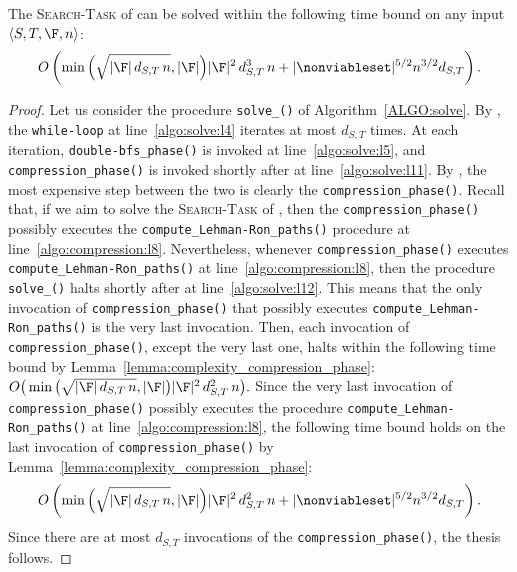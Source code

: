 \begin{proposition}\label{prop:complexity_solve_search}
The \textsc{Search-Task} of {\mainproblem} can be solved within the following time bound
on any input $\langle S, T, \F, n \rangle$:
\[
O\left(\min\Big(\sqrt{|\F|\, d_{S,T}\, n}, |\F|\Big) |\F|^2\, d^3_{S,T}\, n +
 |\nonviableset|^{5/2} n^{3/2} d_{S,T} \right).
\]
\end{proposition}
\begin{proof}
Let us consider the procedure \texttt{solve\_\mainproblem()} of Algorithm~\ref{ALGO:solve}.
By , the \texttt{while-loop} at line~\ref{algo:solve:l4} iterates at most $d_{S,T}$ times.
At each iteration, \texttt{double-bfs\_phase()} is invoked at line~\ref{algo:solve:l5},
and \texttt{compression\_phase()} is invoked shortly after at line~\ref{algo:solve:l11}.
By , the most expensive step between the two is clearly the \texttt{compression\_phase()}.
Recall that, if we aim to solve the \textsc{Search-Task} of \mainproblem, then the \texttt{compression\_phase()} possibly executes
the \texttt{compute\_Lehman-Ron\_paths()} procedure at line~\ref{algo:compression:l8}.
Nevertheless, whenever \texttt{compression\_phase()} executes \texttt{compute\_Lehman-Ron\_paths()} at line~\ref{algo:compression:l8},
then the procedure \texttt{solve\_\mainproblem()} halts shortly after at line~\ref{algo:solve:l12}.
This means that the only invocation of \texttt{compression\_phase()} that possibly
executes \texttt{compute\_Lehman-Ron\_paths()} is the very last invocation.
Then, each invocation of \texttt{compression\_phase()}, except the very last one,
halts within the following time bound by Lemma~\ref{lemma:complexity_compression_phase}:
$O\big(\min\big(\sqrt{|\F|\, d_{S,T}\, n}, |\F|\big) |\F|^2\, d^2_{S,T}\, n \big).$
Since the very last invocation of \texttt{compression\_phase()} possibly executes the procedure
\texttt{compute\_Lehman-Ron\_paths()} at line~\ref{algo:compression:l8}, the following time bound holds on the last invocation of
\texttt{compression\_phase()} by Lemma~\ref{lemma:complexity_compression_phase}:
\[O\left(\min\Big(\sqrt{|\F|\, d_{S,T}\, n}, |\F|\Big) |\F|^2\, d^2_{S,T}\, n + |\nonviableset|^{5/2} n^{3/2} d_{S,T} \right).\]
Since there are at most $d_{S,T}$ invocations of the \texttt{compression\_phase()}, the thesis follows.
\end{proof}
